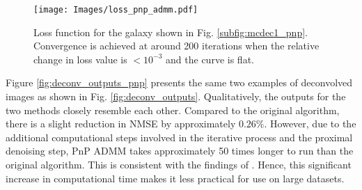 \documentclass[traditabstract]{aa}
\begin{document}
\begin{appendix}
\begin{figure}[h!]
    \centering
    \label{fig:loss_pnp}\texttt{[image: Images/loss\_pnp\_admm.pdf]}
    \caption{Loss function for the galaxy shown in Fig. \ref{subfig:mcdec1_pnp}. Convergence is achieved at around 200 iterations when the relative change in loss value is $<10^{-3}$ and the curve is flat.}
    \label{fig:loss_pnp}
\end{figure}

Figure \ref{fig:deconv_outputs_pnp} presents the same two examples of deconvolved images as shown in Fig. \ref{fig:deconv_outputs}. Qualitatively, the outputs for the two methods closely resemble each other. Compared to the original algorithm, there is a slight reduction in NMSE by approximately $0.26\%$. However, due to the additional computational steps involved in the iterative process and the proximal denoising step, PnP ADMM takes approximately 50 times longer to run than the original algorithm. This is consistent with the findings of \cite{sureau2020}. Hence, this significant increase in computational time makes it less practical for use on large datasets.

\begin{figure*}[h!]
\centering
    \\
    
\caption{\label{fig:deconv_outputs_pnp} {Outputs of the PnP ADMM algorithm for the two galaxies shown in Fig. \ref{fig:deconv_outputs}, closely matching the results presented in the same figure. First column: Euclid VIS image.\ Second: Rubin simulations in the $r$, $i$, and $z$ bands. Third: Deconvolved outputs for the three bands. Fourth: Corresponding ground-truth HST images.\ Fifth: Residuals.}}
\end{figure*}
\end{appendix}
\end{document}

